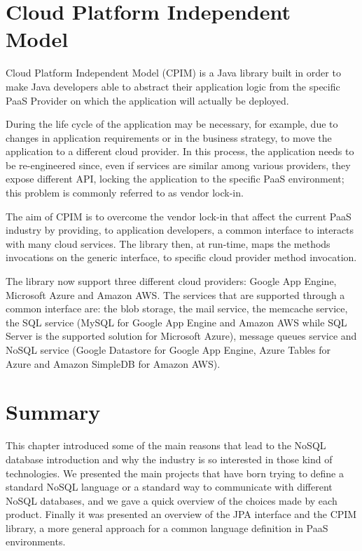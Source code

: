 \section{Cloud Platform Independent Model}
\label{sec:cpim}
Cloud Platform Independent Model (CPIM) \cite{thesis:cpim} is a Java library built in order to make Java developers able to abstract their application logic from the specific PaaS Provider on which the application will actually be deployed.

\noindent During the life cycle of the application may be necessary, for example, due to changes in application requirements or in the business strategy, to move the application to a different cloud provider.
In this process, the application needs to be re-engineered since, even if services are similar among various providers, they expose different API, locking the application to the specific PaaS environment; this problem is commonly referred to as vendor lock-in.

\noindent The aim of CPIM is to overcome the vendor lock-in that affect the current PaaS industry by providing, to application developers, a common interface to interacts with many cloud services. The library then, at run-time, maps the methods invocations on the generic interface, to specific cloud provider method invocation.

\noindent The library now support three different cloud providers: Google App Engine, Microsoft Azure and Amazon AWS.
The services that are supported through a common interface are: the blob storage, the mail service, the memcache service, the SQL service (MySQL for Google App Engine and Amazon AWS while SQL Server is the supported solution  for Microsoft Azure), message queues service and NoSQL service (Google Datastore for Google App Engine, Azure Tables for Azure and Amazon SimpleDB for Amazon AWS).

\section{Summary}
This chapter introduced some of the main reasons that lead to the NoSQL database introduction and why the industry is so interested in those kind of technologies. 
\noindent We presented the main projects that have born trying to define a standard NoSQL language or a standard way to communicate with different NoSQL databases, and we gave a quick overview of the choices made by each product. 
\noindent Finally it was presented an overview of the JPA interface and the CPIM library, a more general approach for a common language definition in PaaS environments.
